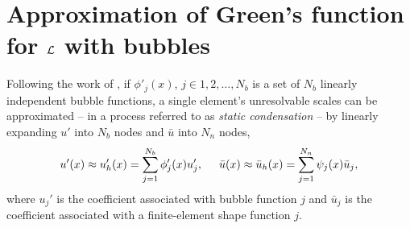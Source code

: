 \section{Approximation of Green's function for $\mathcal{L}$ with bubbles}

Following the work of \citet{hughes_1995}, if $\phi'_j(x)$, $j \in 1,2,\ldots,N_b$ is a set of $N_b$ linearly independent bubble functions, a single element's unresolvable scales can be approximated -- in a process referred to as  \emph{static condensation} -- by linearly expanding $u'$ into $N_b$ nodes and $\bar{u}$ into $N_n$ nodes,
\begin{align}
  \label{bubble_u_approximation}
  u'(x) \approx u_h'(x) = \sum_{j=1}^{N_b} \phi_j'(x) u_j', \hspace{5mm} \bar{u}(x) \approx \bar{u}_h(x) = \sum_{j=1}^{N_n} \psi_j(x) \bar{u}_j,
\end{align}
where $u_j'$ is the coefficient associated with bubble function $j$ and $\bar{u}_j$ is the coefficient associated with a finite-element shape function $j$.

